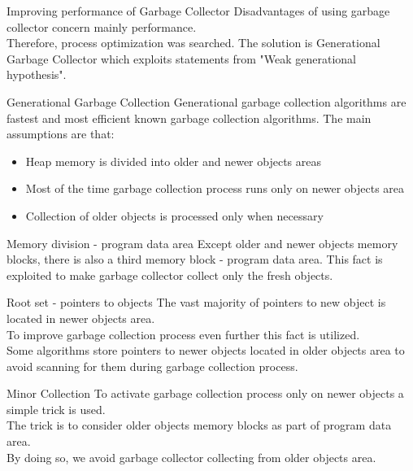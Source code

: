 \documentclass[presentation]{beamer}
\begin{document}
\begin{frame}{Improving performance of Garbage Collector}
	Disadvantages of using garbage collector concern mainly performance. 
	\\Therefore, process optimization was searched.
	\newline
	The solution is Generational Garbage Collector which exploits statements from "Weak generational hypothesis".
\end{frame}


\begin{frame}{Generational Garbage Collection}
	Generational garbage collection algorithms are fastest and most efficient known garbage collection algorithms.
	 The main assumptions are that:
	 \newline
	 \begin{itemize}
	 	\item Heap memory is divided into older and newer objects areas
	 	\item Most of the time garbage collection process runs only on newer objects area
	 	\item Collection of older objects is processed only when necessary
	 \end{itemize}
\end{frame}

\begin{frame}{Memory division - program data area}
	Except older and newer objects memory blocks, there is also a third memory block - program data area.
	\newline
	This fact is exploited to make garbage collector collect only the fresh objects.
\end{frame}

\begin{frame}{Root set - pointers to objects}
	The vast majority of pointers to new object is located in newer objects area.
	\\
	To improve garbage collection process even further this fact is utilized.
	\\
	Some algorithms store pointers to newer objects located in older objects area to avoid scanning for them during garbage collection process.
\end{frame}

\begin{frame}{Minor Collection}
To activate garbage collection process only on newer objects a simple trick is used.
\\
The trick is to consider older objects memory blocks as part of program data area.
\\
By doing so, we avoid garbage collector collecting from older objects area.
\end{frame}
\end{document}
